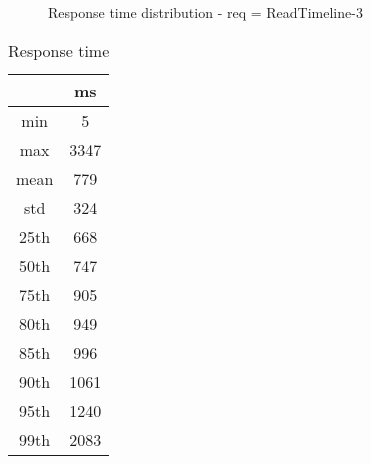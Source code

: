 \begin{minipage}{0.75\linewidth}
\begin{figure}[h]
\begin{adjustbox}{max width=1.0\linewidth, keepaspectratio}
  \end{adjustbox}
  \caption{Response time distribution - req = ReadTimeline-3}
\end{figure}
\end{minipage}\hfill\begin{minipage}{0.18\linewidth}
\begin{table}[h]
\begin{tabular}{|cc|}
\hline
\textbf{} & \textbf{ms}\\ \hline
 \Xhline{0.005\arrayrulewidth}
min & 5\\
 \Xhline{0.005\arrayrulewidth}
max & 3347\\
 \Xhline{0.005\arrayrulewidth}
mean & 779\\
 \Xhline{0.005\arrayrulewidth}
std & 324\\
\hline
\hline
 \Xhline{0.005\arrayrulewidth}
25th & 668\\
 \Xhline{0.005\arrayrulewidth}
50th & 747\\
 \Xhline{0.005\arrayrulewidth}
75th & 905\\
 \Xhline{0.005\arrayrulewidth}
80th & 949\\
 \Xhline{0.005\arrayrulewidth}
85th & 996\\
 \Xhline{0.005\arrayrulewidth}
90th & 1061\\
 \Xhline{0.005\arrayrulewidth}
95th & 1240\\
 \Xhline{0.005\arrayrulewidth}
99th & 2083\\
\hline
\end{tabular}
\caption{Response time}
\end{table}
\end{minipage}\hfill